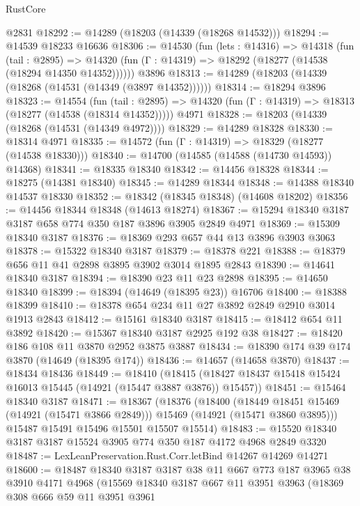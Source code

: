 \begin{lexlean}{RustCore}
\begin{coremodule}
    @2831
@18292 := @14289 (@18203 (@14339 (@18268 @14532)))
@18294 := @14539 @18233 @16636
@18306 := @14530
    (fun (lets : @14316) =>
    @14318
      (fun (tail : @2895) =>
      @14320 (fun (Γ : @14319) => @18292 (@18277 (@14538 (@18294 @14350 @14352))))))
    @3896
@18313 := @14289 (@18203 (@14339 (@18268 (@14531 (@14349 (@3897 @14352))))))
@18314 := @18294 @3896
@18323 := @14554
    (fun (tail : @2895) => @14320 (fun (Γ : @14319) => @18313 (@18277 (@14538 (@18314 @14352)))))
    @4971
@18328 := @18203 (@14339 (@18268 (@14531 (@14349 @4972))))
@18329 := @14289 @18328
@18330 := @18314 @4971
@18335 := @14572 (fun (Γ : @14319) => @18329 (@18277 (@14538 @18330)))
@18340 := @14700 (@14585 (@14588 (@14730 @14593)) @14368)
@18341 := @18335 @18340
@18342 := @14456 @18328
@18344 := @18275 (@14381 @18340)
@18345 := @14289 @18344
@18348 := @14388 @18340 @14537 @18330
@18352 := @18342 (@18345 @18348) (@14608 @18202)
@18356 := @14456 @18344 @18348 (@14613 @18274)
@18367 := @15294 @18340 @3187 @3187 @658 @774 @350 @187 @3896 @3905 @2849 @4971
@18369 := @15309 @18340 @3187
@18376 := @18369 @293 @657 @44 @13 @3896 @3903 @3063
@18378 := @15322 @18340 @3187
@18379 := @18378 @221
@18388 := @18379 @656 @11 @41 @2898 @3895 @3902 @3014 @1895 @2843
@18390 := @14641 @18340 @3187
@18394 := @18390 @23 @11 @23 @2898
@18395 := @14650 @18340
@18399 := @18394 (@14649 (@18395 @23)) @16706
@18400 := @18388 @18399
@18410 := @18378 @654 @234 @11 @27 @3892 @2849 @2910 @3014 @1913 @2843
@18412 := @15161 @18340 @3187
@18415 := @18412 @654 @11 @3892
@18420 := @15367 @18340 @3187 @2925 @192 @38
@18427 := @18420 @186 @108 @11 @3870 @2952 @3875 @3887
@18434 := @18390 @174 @39 @174 @3870 (@14649 (@18395 @174))
@18436 := @14657 (@14658 @3870)
@18437 := @18434 @18436
@18449 := @18410
    (@18415 (@18427 @18437 @15418 @15424 @16013 @15445 (@14921 (@15447 @3887 @3876)) @15457))
@18451 := @15464 @18340 @3187
@18471 := @18367
    (@18376
      (@18400
        (@18449 @18451 @15469 (@14921 (@15471 @3866 @2849)))
        @15469
        (@14921 (@15471 @3860 @3895)))
      @15487
      @15491
      @15496
      @15501
      @15507
      @15514)
@18483 := @15520 @18340 @3187 @3187 @15524 @3905 @774 @350 @187 @4172 @4968 @2849 @3320
@18487 := LexLeanPreservation.Rust.Corr.letBind @14267 @14269 @14271
@18600 := @18487
    @18340
    @3187
    @3187
    @38
    @11
    @667
    @773
    @187
    @3965
    @38
    @3910
    @4171
    @4968
    (@15569
      @18340
      @3187
      @667
      @11
      @3951
      @3963
      (@18369
        @308
        @666
        @59
        @11
        @3951
        @3961

\end{coremodule}
\end{lexlean}
